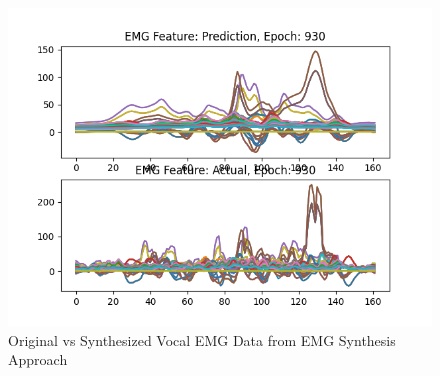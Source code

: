 \begin{figure}[hbtp]
    \caption{Original vs Synthesized Vocal EMG Data from EMG Synthesis Approach}
    \label{fig:real-vs-pred-emg}
    \centering
    \includegraphics[width=0.75\linewidth]{graphics/emg_augment/real_vs_synth.png}
\end{figure}